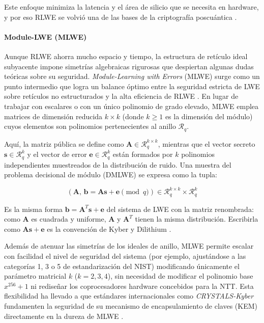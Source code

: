 Este enfoque minimiza la latencia y el área de silicio que se necesita en hardware, y por eso RLWE se volvió una de las bases de la criptografía poscuántica \cite{nguyen2019high, mukil2026implementing}.

\paragraph{Module-LWE (MLWE)}
Aunque RLWE ahorra mucho espacio y tiempo, la estructura de retículo ideal subyacente impone simetrías algebraicas rigurosas que despiertan algunas dudas teóricas sobre su seguridad. \textit{Module-Learning with Errors} (MLWE) surge como un punto intermedio que logra un balance óptimo entre la seguridad estricta de LWE sobre retículos no estructurados y la alta eficiencia de RLWE \cite{mukil2026implementing, yang2025multiserver}. En lugar de trabajar con escalares o con un único polinomio de grado elevado, MLWE emplea matrices de dimensión reducida $k \times k$ (donde $k \ge 1$ es la dimensión del módulo) cuyos elementos son polinomios pertenecientes al anillo $\mathcal{R}_q$.

Aquí, la matriz pública se define como $\mathbf{A} \in \mathcal{R}_q^{k \times k}$, mientras que el vector secreto $\mathbf{s} \in \mathcal{R}_q^k$ y el vector de error $\mathbf{e} \in \mathcal{R}_q^k$ están formados por $k$ polinomios independientes muestreados de la distribución de ruido. Una muestra del problema decisional de módulo (DMLWE) se expresa como la tupla:

\begin{equation}
(\mathbf{A}, \, \mathbf{b} = \mathbf{A}\mathbf{s} + \mathbf{e} \pmod q) \in \mathcal{R}_q^{k \times k} \times \mathcal{R}_q^k
\end{equation}

Es la misma forma $\mathbf{b} = \mathbf{A}^T\mathbf{s} + \mathbf{e}$ del sistema de LWE con la matriz renombrada: como $\mathbf{A}$ es cuadrada y uniforme, $\mathbf{A}$ y $\mathbf{A}^T$ tienen la misma distribución. Escribirla como $\mathbf{A}\mathbf{s} + \mathbf{e}$ es la convención de Kyber y Dilithium \cite{avanzi2021kyber, bai2021dilithium}.

Además de atenuar las simetrías de los ideales de anillo, MLWE permite escalar con facilidad el nivel de seguridad del sistema \cite{yang2025multiserver} (por ejemplo, ajustándose a las categorías 1, 3 o 5 de estandarización del NIST) modificando únicamente el parámetro matricial $k$ ($k=2, 3, 4$), sin necesidad de modificar el polinomio base $x^{256} + 1$ ni rediseñar los coprocesadores hardware concebidos para la NTT. Esta flexibilidad ha llevado a que estándares internacionales como \textit{CRYSTALS-Kyber} fundamenten la seguridad de su mecanismo de encapsulamiento de claves (KEM) directamente en la dureza de MLWE \cite{mukil2026implementing}.

